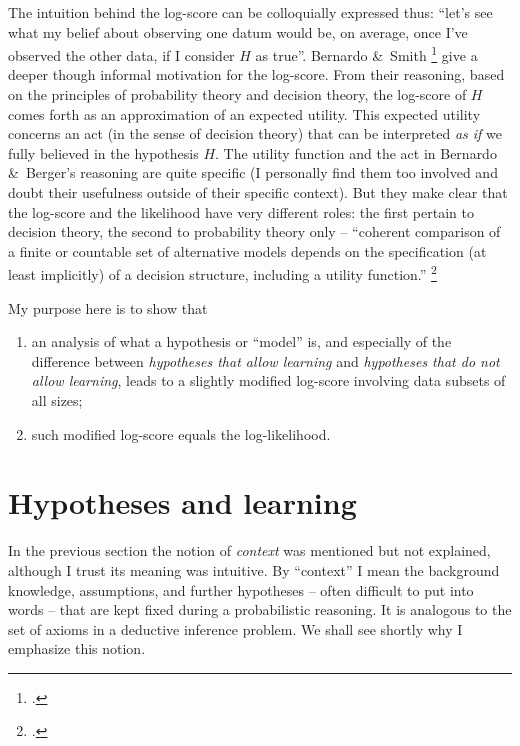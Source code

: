 \documentclass[\ifafour a4paper,12pt,\else a5paper,10pt,\fi%
onecolumn,oneside,article,%
british%
]{memoir}
\theoremstyle{remark}
\theoremstyle{innote}
\newcommand*{\citep}{\footcites}
\newcommand*{\amp}{\&}
\renewcommand*{\|}[1][]{\nonscript\,#1\vert\nonscript\;\mathopen{}}
\newcommand*{\sect}{\S}%
\begin{document}
The intuition behind the log-score can be colloquially expressed thus:
\enquote{let's see what my belief about observing one datum would be, on
  average, once I've observed the other data, if I consider $H$ as true}.
Bernardo \amp\ Smith \citep[\sect~6.1.6]{bernardoetal1994_r2000} give a
deeper though informal motivation for the log-score. From their reasoning,
based on the principles of probability theory and decision theory, the
log-score of $H$ comes forth as an approximation of an expected utility.
This expected utility concerns an act (in the sense of decision theory)
that can be interpreted \emph{as if} we fully believed in the hypothesis
$H$. The utility function and the act in Bernardo \amp\ Berger's reasoning
are quite specific (I personally find them too involved and doubt their
usefulness outside of their specific context). But they make clear that the
log-score and the likelihood have very different roles: the first pertain
to decision theory, the second to probability theory only --
\enquote{coherent comparison of a finite or countable set of alternative
  models depends on the specification (at least implicitly) of a decision
  structure, including a utility function.} \citep[\sect~6.1.3
p.~388]{bernardoetal1994_r2000}

My purpose here is to show that
\begin{enumerate}[label=(\alph*)]
\item an analysis of what a hypothesis or \enquote{model} is, and
  especially of the difference between \emph{hypotheses that allow
    learning} and \emph{hypotheses that do not allow learning}, leads
  to a slightly modified log-score involving data subsets of all sizes;
\item such modified log-score equals the log-likelihood.
\end{enumerate}


\section{Hypotheses and learning}
\label{sec:hyp_learn}

In the previous section the notion of \emph{context} was mentioned but not
explained, although I trust its meaning was intuitive. By \enquote{context}
I mean the background knowledge, assumptions, and further hypotheses --
often difficult to put into words -- that are kept fixed during a
probabilistic reasoning. It is analogous to the set of axioms in a
deductive inference problem. We shall see shortly why I emphasize this
notion.
\end{document}
